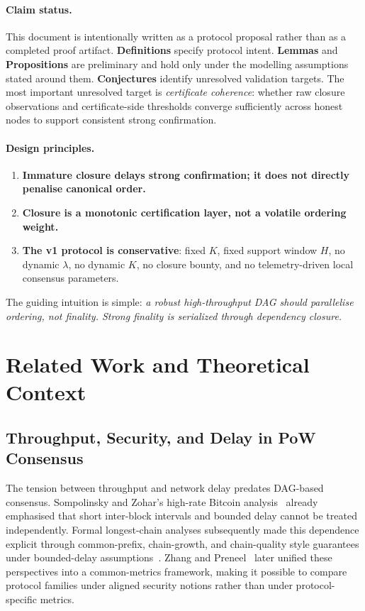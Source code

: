 \documentclass[11pt]{article}
\theoremstyle{definition}
\theoremstyle{plain}
\theoremstyle{remark}
\begin{document}
\paragraph{Claim status.}
This document is intentionally written as a protocol proposal rather than as a
completed proof artifact.
\textbf{Definitions} specify protocol intent.
\textbf{Lemmas} and \textbf{Propositions} are preliminary and hold only under
the modelling assumptions stated around them.
\textbf{Conjectures} identify unresolved validation targets.
The most important unresolved target is \emph{certificate coherence}: whether raw
closure observations and certificate-side thresholds converge sufficiently
across honest nodes to support consistent strong confirmation.

\paragraph{Design principles.}
\begin{enumerate}[nosep]
    \item \textbf{Immature closure delays strong confirmation; it does not directly
    penalise canonical order.}
    \item \textbf{Closure is a monotonic certification layer, not a volatile
    ordering weight.}
    \item \textbf{The v1 protocol is conservative}: fixed $K$, fixed support
    window $H$, no dynamic $\lambda$, no dynamic $K$, no closure bounty, and no
    telemetry-driven local consensus parameters.
\end{enumerate}
The guiding intuition is simple: \emph{a robust high-throughput DAG should
parallelise ordering, not finality.  Strong finality is serialized through
dependency closure.}

\section{Related Work and Theoretical Context}\label{sec:background}

\subsection{Throughput, Security, and Delay in PoW Consensus}

The tension between throughput and network delay predates DAG-based consensus.
Sompolinsky and Zohar's high-rate Bitcoin analysis~\cite{sompolinsky2013secure}
already emphasised that short inter-block intervals and bounded delay cannot be
treated independently.
Formal longest-chain analyses subsequently made this dependence explicit
through common-prefix, chain-growth, and chain-quality style guarantees under
bounded-delay assumptions~\cite{garay2015backbone}.
Zhang and Preneel~\cite{zhang2019common} later unified these perspectives into
a common-metrics framework, making it possible to compare protocol families
under aligned security notions rather than under protocol-specific metrics.
\end{document}
